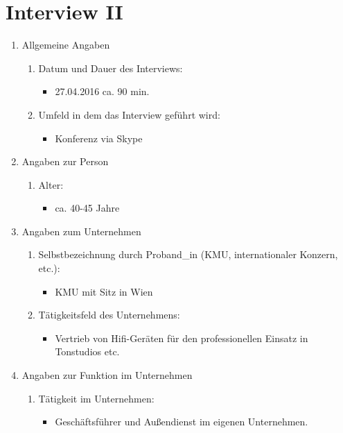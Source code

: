 \documentclass[Bachelorarbeit.tex]{subfiles}
\begin{document}
\section{Interview II}
\label{anhang:interview2}
\begin{enumerate}
	\item Allgemeine Angaben
	\begin{enumerate}
		\item Datum und Dauer des Interviews:
		\begin{itemize}
			\item[] 27.04.2016 ca. 90 min.
		\end{itemize}
		\item Umfeld in dem das Interview geführt wird:
		\begin{itemize}
			\item[] Konferenz via Skype
		\end{itemize}
	\end{enumerate}
	\item Angaben zur Person
	\begin{enumerate}
		\item Alter: 
		\begin{itemize}
			\item[] ca. 40-45 Jahre
		\end{itemize}
	\end{enumerate}
	\item Angaben zum Unternehmen
	\begin{enumerate}
		\item Selbstbezeichnung durch Proband\_in  (\ac{KMU}, internationaler Konzern, etc.):
		\begin{itemize}
			\item[] \ac{KMU} mit Sitz in Wien
		\end{itemize}
		\item Tätigkeitsfeld des Unternehmens:
		\begin{itemize}
			\item[] Vertrieb von Hifi-Geräten für den professionellen Einsatz in Tonstudios etc. 
		\end{itemize}
	\end{enumerate}
	\item Angaben zur Funktion im Unternehmen
	\begin{enumerate}
		\item Tätigkeit im Unternehmen:
		\begin{itemize}
			\item[] Geschäftsführer und Außendienst im eigenen Unternehmen.

\end{itemize}
\end{enumerate}
\end{enumerate}
\end{document}
